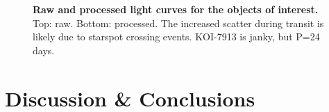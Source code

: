 \documentclass[12pt,twocolumn,linenumbers]{aastex63}
\begin{document}
\begin{figure}[tp]
\begin{center}
		\vspace{-1.45cm}	
	\end{center}
	\vspace{-0.7cm}
	\caption{
		{\bf Raw and processed light curves for the objects of
    interest.} Top: raw.  Bottom: processed.
    The increased scatter during transit is likely due to starspot
    crossing events.  KOI-7913 is janky, but P=24 days.
		\label{fig:planets}
	}
\end{figure}


\section{Discussion \& Conclusions}
\label{sec:disc_conc}
\end{document}
